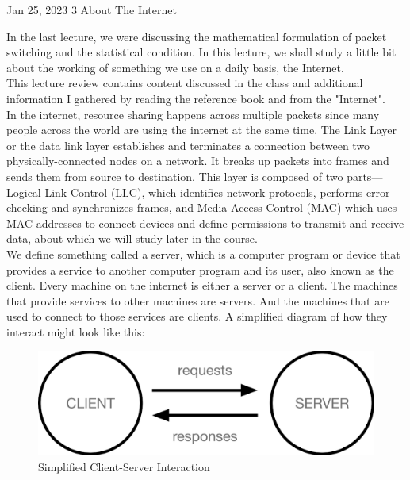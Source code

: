 \documentclass[a4paper,11pt]{scrarticle}
\begin{document}
           {Jan 25, 2023}                    		%
           {3}                                      %
           {About The Internet}							%

\noindent
In the last lecture, we were discussing the mathematical formulation of packet switching and the statistical condition. In this lecture, we shall study a little bit about the working of something we use on a daily basis, the Internet.\\This lecture review contains content discussed in the class and additional information I gathered by reading the reference book and from the "Internet".\\ In the internet, resource sharing happens across multiple packets since many people across the world are using the internet at the same time. The Link Layer or the data link layer establishes and terminates a connection between two physically-connected nodes on a network. It breaks up packets into frames and sends them from source to destination. This layer is composed of two parts—Logical Link Control (LLC), which identifies network protocols, performs error checking and synchronizes frames, and Media Access Control (MAC) which uses MAC addresses to connect devices and define permissions to transmit and receive data, about which we will study later in the course.\\We define something called a server, which is a computer program or device that provides a service to another computer program and its user, also known as the client. Every machine on the internet is either a server or a client. The machines that provide services to other machines are servers. And the machines that are used to connect to those services are clients. A simplified diagram of how they interact might look like this:

\begin{figure}[H]
     \centering
     \includegraphics[scale=0.2]{fig1.png}
     \caption{Simplified Client-Server Interaction}
\end{figure}
\end{document}
